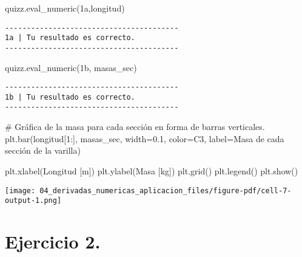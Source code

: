 \documentclass[
  letterpaper,
  DIV=11,
  numbers=noendperiod]{scrreprt}
\newenvironment{Shaded}{\begin{snugshade}}{\end{snugshade}}
\newcommand{\CommentTok}[1]{\textcolor[rgb]{0.37,0.37,0.37}{#1}}
\newcommand{\DecValTok}[1]{\textcolor[rgb]{0.68,0.00,0.00}{#1}}
\newcommand{\FloatTok}[1]{\textcolor[rgb]{0.68,0.00,0.00}{#1}}
\newcommand{\NormalTok}[1]{\textcolor[rgb]{0.00,0.23,0.31}{#1}}
\newcommand{\OperatorTok}[1]{\textcolor[rgb]{0.37,0.37,0.37}{#1}}
\newcommand{\StringTok}[1]{\textcolor[rgb]{0.13,0.47,0.30}{#1}}
\begin{document}
\begin{Shaded}
\begin{Highlighting}[]
\NormalTok{quizz.eval\_numeric(}\StringTok{\textquotesingle{}1a\textquotesingle{}}\NormalTok{,longitud)}
\end{Highlighting}
\end{Shaded}

\begin{verbatim}
----------------------------------------
1a | Tu resultado es correcto.
----------------------------------------
\end{verbatim}

\begin{Shaded}
\begin{Highlighting}[]
\NormalTok{quizz.eval\_numeric(}\StringTok{\textquotesingle{}1b\textquotesingle{}}\NormalTok{, masas\_sec)}
\end{Highlighting}
\end{Shaded}

\begin{verbatim}
----------------------------------------
1b | Tu resultado es correcto.
----------------------------------------
\end{verbatim}

\begin{Shaded}
\begin{Highlighting}[]
\CommentTok{\# Gráfica de la masa para cada sección en forma de barras verticales.}
\NormalTok{plt.bar(longitud[}\DecValTok{1}\NormalTok{:], masas\_sec, }
\NormalTok{        width}\OperatorTok{=}\FloatTok{0.1}\NormalTok{, color}\OperatorTok{=}\StringTok{\textquotesingle{}C3\textquotesingle{}}\NormalTok{, }
\NormalTok{        label}\OperatorTok{=}\StringTok{\textquotesingle{}Masa de cada sección de la varilla\textquotesingle{}}\NormalTok{)}

\NormalTok{plt.xlabel(}\StringTok{\textquotesingle{}Longitud [m]\textquotesingle{}}\NormalTok{)}
\NormalTok{plt.ylabel(}\StringTok{\textquotesingle{}Masa [kg]\textquotesingle{}}\NormalTok{)}
\NormalTok{plt.grid()}
\NormalTok{plt.legend()}
\NormalTok{plt.show()}
\end{Highlighting}
\end{Shaded}

\texttt{[image: 04\_derivadas\_numericas\_aplicacion\_files/figure-pdf/cell-7-output-1.png]}

\section{Ejercicio 2.}\label{ejercicio-2.-1}
\end{document}
